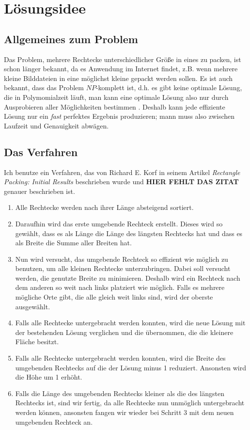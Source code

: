 \documentclass[a4paper,10pt,ngerman]{scrartcl}
\title{\Aufgabe}
\author{\Name\\Team-ID: \TeamId}
\date{\today}
\begin{document}
\maketitle
\tableofcontents
\clearpage


\section{Lösungsidee} 

\subsection{Allgemeines zum Problem}
Das Problem, mehrere Rechtecke unterschiedlicher Größe in eines zu packen, ist schon länger bekannt, da es Anwendung im Internet findet, z.B. wenn mehrere kleine Bilddateien in eine möglichst kleine gepackt werden sollen. Es ist auch bekannt, dass das Problem $NP$-komplett ist, d.h. es gibt keine optimale Lösung, die in Polymomialzeit läuft, man kann eine optimale Lösung also nur durch Ausprobieren aller Möglichkeiten bestimmen \cite{korf}. Deshalb kann jede effiziente Lösung nur ein \textit{fast} perfektes Ergebnis produzieren; mann muss also zwischen Laufzeit und Genauigkeit abwägen.

\subsection{Das Verfahren}
Ich benutze ein Verfahren, das von Richard E. Korf in seinem Artikel \textit{Rectangle Packing: Initial Results} beschrieben wurde und \textbf{HIER FEHLT DAS ZITAT} genauer beschrieben ist.

\begin{enumerate}
  \item Alle Rechtecke werden nach ihrer Länge absteigend sortiert.
  \item Daraufhin wird das erste umgebende Rechteck erstellt. Dieses wird so gewählt, dass es als Länge die Länge des längsten Rechtecks hat und dass es als Breite die Summe aller Breiten hat.
  \item Nun wird versucht, das umgebende Rechteck so effizient wie möglich zu benutzen, um alle kleinen Rechtecke unterzubringen. Dabei soll versucht werden, die genutzte Breite zu minimieren. Deshalb wird ein Rechteck nach dem anderen so weit nach links platziert wie möglich. Falls es mehrere mögliche Orte gibt, die alle gleich weit links sind, wird der oberste ausgewählt.
  \item Falls alle Rechtecke untergebracht werden konnten, wird die neue Lösung mit der bestehenden Lösung verglichen und die übernommen, die die kleinere Fläche besitzt.
  \item Falls alle Rechtecke untergebracht werden konnten, wird die Breite des umgebenden Rechtecks auf die der Lösung minus 1 reduziert. Ansonsten wird die Höhe um 1 erhöht.
  \item Falls die Länge des umgebenden Rechtecks kleiner als die des längsten Rechtecks ist, sind wir fertig, da alle Rechtecke nun unmöglich untergebracht werden können, ansonsten fangen wir wieder bei Schritt 3 mit dem neuen umgebenden Rechteck an.
\end{enumerate}
\end{document}
